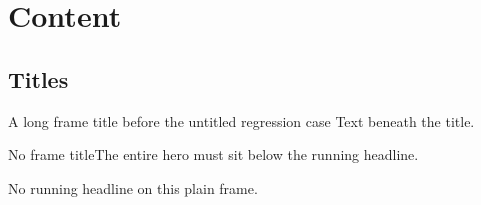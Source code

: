 \documentclass[aspectratio=169]{beamer}
\begin{document}
\section{Content}\subsection{Titles}
\begin{frame}{A long frame title before the untitled regression case}
  Text beneath the title.
\end{frame}
\begin{frame}
  \begin{block}{No frame title}The entire hero must sit below the running headline.\end{block}
\end{frame}
\begin{frame}[plain]No running headline on this plain frame.\end{frame}
\end{document}
